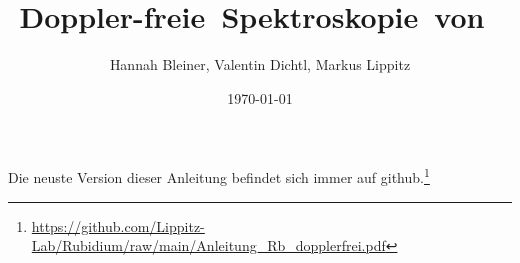\documentclass[notoc,nofonts,a4paper,twoside,nobib]{tufte-book}
\begin{document}
\sloppy
\tikzexternaldisable


\title{\hbox{Doppler-freie Spektroskopie von }}

\author{Hannah Bleiner, Valentin Dichtl, Markus Lippitz}
\date{\today}


\maketitle





\thispagestyle{show_doclicense}
\tableofcontents

\vfil
Die neuste Version dieser Anleitung befindet sich immer auf github.\footnote{\url{https://github.com/Lippitz-Lab/Rubidium/raw/main/Anleitung_Rb_dopplerfrei.pdf}} 
\newpage
	
	



\appendix




	\printbibliography
\end{document}
